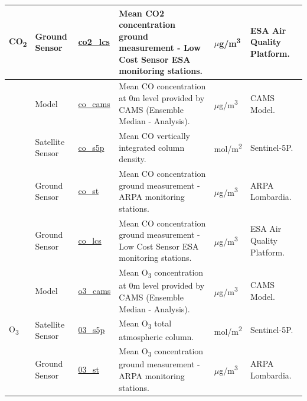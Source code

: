 \begin{center}
\begin{longtable}{ |p{1.5cm}|p{1.5cm}|p{2.3cm}|p{4cm}|p{2cm}|p{2.3cm}| }
\multirow{1}{4em}{CO\textsubscript{2}} & Ground \newline Sensor & \underline{co2\_lcs} &  Mean CO2 concentration ground measurement - Low Cost Sensor ESA monitoring stations. \par & $\mu$g/m\textsuperscript{3} & ESA Air Quality Platform.\\ \hline
\pagebreak
\hline
\multirow{4}{4em}{CO} & Model  & \underline{co\_cams} & Mean CO concentration at 0m level provided by CAMS  (Ensemble Median - Analysis).\par & $\mu$g/m\textsuperscript{3} & CAMS Model.\\ 
& Satellite \newline Sensor  & \underline{co\_s5p} &  Mean CO vertically integrated column density.\par & mol/m\textsuperscript{2} & Sentinel-5P.\\ 
& Ground \newline Sensor & \underline{co\_st} &  Mean CO concentration ground measurement - ARPA monitoring stations. \par & $\mu$g/m\textsuperscript{3} & ARPA \newline Lombardia.\\ 
& Ground \newline Sensor & \underline{co\_lcs} &  Mean CO concentration ground measurement - Low Cost Sensor ESA monitoring stations. \par & $\mu$g/m\textsuperscript{3} & ESA Air Quality Platform.\\ \hline

\multirow{3}{4em}{O\textsubscript{3}} & Model  & \underline{o3\_cams} & Mean O\textsubscript{3} concentration at 0m level provided by CAMS  (Ensemble Median - Analysis).\par & $\mu$g/m\textsuperscript{3} & CAMS Model.\\ 
& Satellite \newline Sensor  & \underline{03\_s5p} &  Mean O\textsubscript{3} total atmospheric column.\par  & mol/m\textsuperscript{2} & Sentinel-5P.\\ 
& Ground \newline Sensor & \underline{03\_st} &  Mean O\textsubscript{3} concentration ground measurement - ARPA monitoring stations.  \par& $\mu$g/m\textsuperscript{3} & ARPA \newline Lombardia.\\ 
 \hline
 

\end{longtable}
\end{center}
